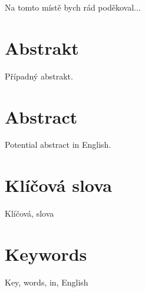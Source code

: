 \documentclass[a4paper,12pt,openany,twoside]{book} %
\begin{document}
\par
\par\vspace*{\fill}

Na tomto místě bych rád poděkoval...

\clearpage

\section*{Abstrakt}

Případný abstrakt.

\section*{Abstract}

Potential abstract in English.

\section*{Klíčová slova}

Klíčová, slova

\section*{Keywords}

Key, words, in, English

\clearpage

\tableofcontents


\cleardoublepage
{}



\clearpage

\pagestyle{plain}

\begin{spacing}{1.05}
\printbibliography[title={Seznam literatury}]
\end{spacing}
\end{document}
